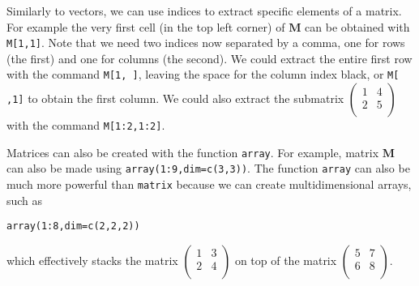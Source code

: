 \documentclass[12pt]{article}
\newcommand{\R}[1] {
	\item \texttt{#1}
}
\newenvironment{verbatim}{ 
	\indent
	\begin{list}{}{\setlength{\itemsep}{-1.5mm}}
}{
	\end{list}
}
\begin{document}
Similarly to vectors, we can use indices to extract specific elements of a matrix.  For example the very first cell (in the top left corner) of $\mathbf{M}$ can be obtained with \verb+M[1,1]+.  Note that we need two indices now separated by a comma, one for rows (the first) and one for columns (the second).  We could extract the entire first row with the command \verb+M[1, ]+, leaving the space for the column index black, or \verb+M[ ,1]+ to obtain the first column.  We could also extract the submatrix
$
\left(
	\begin{array}{ccc}
		1	&	4	\\
		2	&	5	\\
	\end{array}
\right)
$
with the command \verb+M[1:2,1:2]+.

Matrices can also be created with the function \verb+array+.  For example, matrix $\mathbf{M}$ can also be made using \verb+array(1:9,dim=c(3,3))+.  The function \verb+array+ can also be much more powerful than \verb+matrix+ because we can create multidimensional arrays, such as
\begin{verbatim}
	\R{array(1:8,dim=c(2,2,2))}
\end{verbatim}
which effectively stacks the matrix
$
\left(
	\begin{array}{ccc}
		1	&	3	\\
		2	&	4	\\
	\end{array}
\right)
$
on top of the matrix
$
\left(
	\begin{array}{ccc}
		5	&	7	\\
		6	&	8	\\
	\end{array}
\right)
$.
\end{document}

